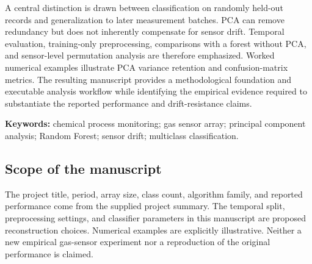\documentclass[11pt,a4paper]{article}
\begin{document}
A central distinction is drawn between classification on randomly held-out records and generalization to later measurement batches. PCA can remove redundancy but does not inherently compensate for sensor drift. Temporal evaluation, training-only preprocessing, comparisons with a forest without PCA, and sensor-level permutation analysis are therefore emphasized. Worked numerical examples illustrate PCA variance retention and confusion-matrix metrics. The resulting manuscript provides a methodological foundation and executable analysis workflow while identifying the empirical evidence required to substantiate the reported performance and drift-resistance claims.

\textbf{Keywords:} chemical process monitoring; gas sensor array; principal component analysis; Random Forest; sensor drift; multiclass classification.

\subsection*{Scope of the manuscript}
The project title, period, array size, class count, algorithm family, and reported performance come from the supplied project summary. The temporal split, preprocessing settings, and classifier parameters in this manuscript are proposed reconstruction choices. Numerical examples are explicitly illustrative. Neither a new empirical gas-sensor experiment nor a reproduction of the original performance is claimed.

\clearpage\begingroup\small\tableofcontents\endgroup
\end{document}
